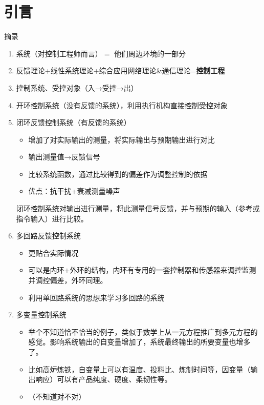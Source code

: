 \documentclass{NHNotebook}
\begin{document}
\section{引言}
摘录
\begin{enumerate}
    \item 系统（对控制工程师而言）$=$ 他们周边环境的一部分
    \item 反馈理论+线性系统理论+综合应用网络理论\&通信理论=\textbf{控制工程}
    \item 控制系统、受控对象（入→受控→出）
    \item 开环控制系统（没有反馈的系统），利用执行机构直接控制受控对象
    \item 闭环反馈控制系统（有反馈的系统）
    \begin{itemize}
        \item 增加了对实际输出的测量，将实际输出与预期输出进行对比
        \item 输出测量值→反馈信号
        \item 比较系统函数，通过比较得到的偏差作为调整控制的依据
        \item 优点：抗干扰+衰减测量噪声    
    \end{itemize}
    \begin{tcolorbox}[reset]
        闭环控制系统对输出进行测量，将此测量信号反馈，并与预期的输入（参考或指令输入）进行比较。
    \end{tcolorbox}
    \item 多回路反馈控制系统
    \begin{itemize}
        \item 更贴合实际情况
        \item 可以是内环$+$外环的结构，内环有专用的一套控制器和传感器来调控监测并调控偏差，外环同理。
        \item 利用单回路系统的思想来学习多回路的系统
    \end{itemize}
    \item 多变量控制系统
    \begin{itemize}
        \item 举个不知道恰不恰当的例子，类似于数学上从一元方程推广到多元方程的感觉。影响系统输出的自变量增加了，系统最终输出的所要变量也增多了。
        \item 比如高炉炼铁，自变量上可以有温度、投料比、炼制时间等，因变量（输出响应）可以有产品纯度、硬度、柔韧性等。
        \item （不知道对不对）
    \end{itemize}
\end{enumerate}
\end{document}
